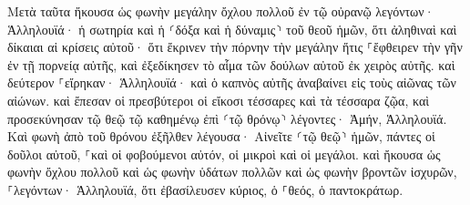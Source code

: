 \documentclass{openreader}
\begin{document}
Μετὰ ταῦτα ἤκουσα ὡς φωνὴν μεγάλην ὄχλου πολλοῦ ἐν τῷ οὐρανῷ λεγόντων· Ἁλληλουϊά· ἡ σωτηρία καὶ ἡ ⸂δόξα καὶ ἡ δύναμις⸃ τοῦ θεοῦ ἡμῶν, 
ὅτι ἀληθιναὶ καὶ δίκαιαι αἱ κρίσεις αὐτοῦ· ὅτι ἔκρινεν τὴν πόρνην τὴν μεγάλην ἥτις ⸀ἔφθειρεν τὴν γῆν ἐν τῇ πορνείᾳ αὐτῆς, καὶ ἐξεδίκησεν τὸ αἷμα τῶν δούλων αὐτοῦ ἐκ χειρὸς αὐτῆς. 
καὶ δεύτερον ⸀εἴρηκαν· Ἁλληλουϊά· καὶ ὁ καπνὸς αὐτῆς ἀναβαίνει εἰς τοὺς αἰῶνας τῶν αἰώνων. 
καὶ ἔπεσαν οἱ πρεσβύτεροι οἱ εἴκοσι τέσσαρες καὶ τὰ τέσσαρα ζῷα, καὶ προσεκύνησαν τῷ θεῷ τῷ καθημένῳ ἐπὶ ⸂τῷ θρόνῳ⸃ λέγοντες· Ἀμήν, Ἁλληλουϊά. 
Καὶ φωνὴ ἀπὸ τοῦ θρόνου ἐξῆλθεν λέγουσα· Αἰνεῖτε ⸂τῷ θεῷ⸃ ἡμῶν, πάντες οἱ δοῦλοι αὐτοῦ, ⸀καὶ οἱ φοβούμενοι αὐτόν, οἱ μικροὶ καὶ οἱ μεγάλοι. 
καὶ ἤκουσα ὡς φωνὴν ὄχλου πολλοῦ καὶ ὡς φωνὴν ὑδάτων πολλῶν καὶ ὡς φωνὴν βροντῶν ἰσχυρῶν, ⸀λεγόντων· Ἁλληλουϊά, ὅτι ἐβασίλευσεν κύριος, ὁ ⸀θεός, ὁ παντοκράτωρ. 
\end{document}
